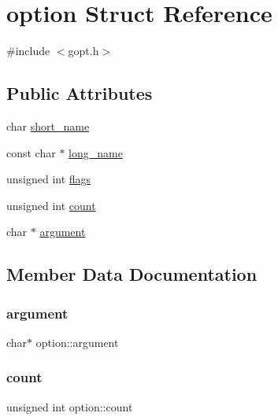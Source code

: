 \hypertarget{structoption}{}\section{option Struct Reference}
\label{structoption}


{\ttfamily \#include $<$gopt.\+h$>$}

\subsection*{Public Attributes}
\begin{DoxyCompactItemize}
\item 
char \hyperlink{structoption_abc0af4c8306684c8c31bb88193a3b040}{short\+\_\+name}
\item 
const char $\ast$ \hyperlink{structoption_afa3bd21f993495477da6350fbdd159da}{long\+\_\+name}
\item 
unsigned int \hyperlink{structoption_a3bb757702735846b5461681fe1af2529}{flags}
\item 
unsigned int \hyperlink{structoption_aca097c2f33b010b53ddaf97a769f432d}{count}
\item 
char $\ast$ \hyperlink{structoption_ac7abe5f58b64ad7ac150d438905b86dd}{argument}
\end{DoxyCompactItemize}


\subsection{Member Data Documentation}
\mbox{\label{structoption_ac7abe5f58b64ad7ac150d438905b86dd}} 
\subsubsection{\texorpdfstring{argument}{argument}}
{\footnotesize\ttfamily char$\ast$ option\+::argument}

\mbox{\label{structoption_aca097c2f33b010b53ddaf97a769f432d}} 
\subsubsection{\texorpdfstring{count}{count}}
{\footnotesize\ttfamily unsigned int option\+::count}

